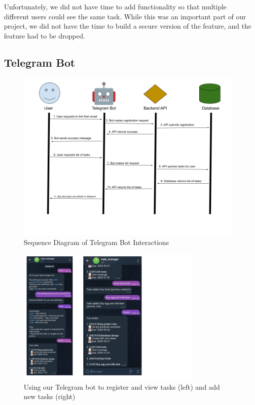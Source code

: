 \documentclass[11pt,oneside]{article}
\begin{document}
Unfortunately, we did not have time to add functionality so that multiple different users could see the same task. While this was an important part of our project, we did not have the time to build a secure version of the feature, and the feature had to be dropped.

\subsection{Telegram Bot}

\begin{figure}[H]
    \centering
    \includegraphics[width=1.0\textwidth]{telegram_bot.png}
    \caption{Sequence Diagram of Telegram Bot Interactions}
    \label{fig:telegram-diagram}
\end{figure}

\begin{figure}[H]
    \centering
    \includegraphics[width=0.8\textwidth]{telegram_example.png}
    \caption{Using our Telegram bot to register and view tasks (left) and add new tasks (right)}
    \label{fig:telegram-example}
\end{figure}
\end{document}
